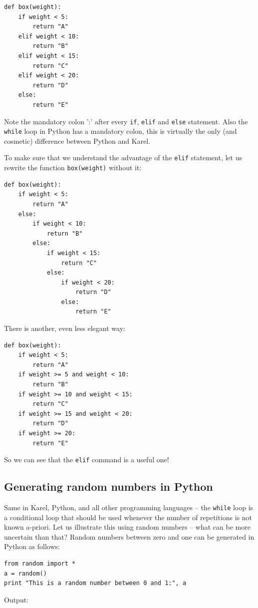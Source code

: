 \begin{verbatim}
def box(weight):
    if weight < 5:
        return "A"
    elif weight < 10:
        return "B"
    elif weight < 15:
        return "C"
    elif weight < 20:
        return "D"
    else:
        return "E"
\end{verbatim}
Note the mandatory colon ':' after every {\tt if}, {\tt elif} and {\tt else} statement. Also
the {\tt while} loop in Python has a mandatory colon, this is virtually the only 
(and cosmetic) difference between Python and Karel.

To make sure that we understand the advantage of the {\tt elif} statement, let us rewrite 
the function {\tt box(weight)} without it:

\begin{verbatim}
def box(weight):
    if weight < 5:
        return "A"
    else:
        if weight < 10:
            return "B"
        else:
            if weight < 15:
                return "C"
            else:
                if weight < 20:
                    return "D"
                else:
                    return "E"
\end{verbatim}
There is another, even less elegant way:

\begin{verbatim}
def box(weight):
    if weight < 5:
        return "A"
    if weight >= 5 and weight < 10:
        return "B"
    if weight >= 10 and weight < 15:
        return "C"
    if weight >= 15 and weight < 20:
        return "D"
    if weight >= 20:
        return "E"
\end{verbatim}
So we can see that the {\tt elif} command is a useful one!

\subsection{Generating random numbers in Python}

Same in Karel, Python, and all other programming 
languages -- the {\tt while} loop is a conditional loop that should be used whenever the number of repetitions 
is not known a-priori. Let us illustrate this using random numbers -- what can be more uncertain than that?
Random numbers between 
zero and one can be generated in Python as follows:

\begin{verbatim}
from random import *
a = random()
print "This is a random number between 0 and 1:", a
\end{verbatim}
Output:

